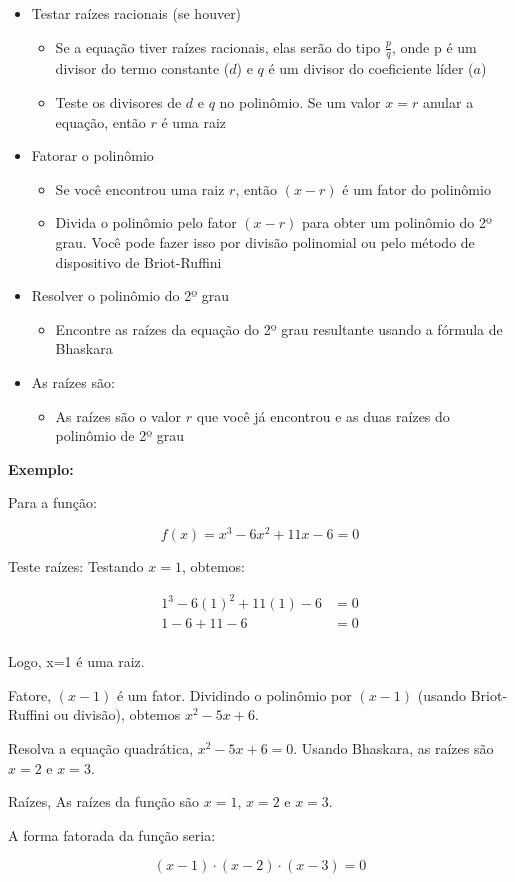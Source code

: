\documentclass[../resumo.tex]{subfiles}
\begin{document}
	\begin{itemize}
		\item Testar raízes racionais (se houver)
		\begin{itemize}
			\item Se a equação tiver raízes racionais, elas serão do tipo $\frac{p}{q}$, onde p é um divisor do
termo constante ($d$) e $q$ é um divisor do coeficiente líder ($a$)
			\item Teste os divisores de $d$ e $q$ no polinômio. Se um valor $x = r$ anular a equação, então $r$ é uma raiz
		\end{itemize}
		\item Fatorar o polinômio
		\begin{itemize}
			\item Se você encontrou uma raiz $r$, então $(x - r)$ é um fator do polinômio
			\item Divida o polinômio pelo fator $(x - r)$ para obter um polinômio do 2º grau. Você pode
fazer isso por divisão polinomial ou pelo método de dispositivo de Briot-Ruffini
		\end{itemize}
		\item Resolver o polinômio do 2º grau
		\begin{itemize}
			\item Encontre as raízes da equação do 2º grau resultante usando a fórmula de Bhaskara
		\end{itemize}
		\item As raízes são:
		\begin{itemize}
			\item As raízes são o valor $r$ que você já encontrou e as duas raízes do polinômio de 2º grau
		\end{itemize}
	\end{itemize}

	\textbf{Exemplo:}

	Para a função:

	\[ f(x) = x^3 - 6x^2 + 11x - 6 = 0 \]

	Teste raízes: Testando $x = 1$, obtemos:

	\begin{align*}
		1^3 - 6(1)^2 + 11(1) - 6 &= 0 \\
		1 - 6 + 11 - 6 &= 0 \\
	\end{align*}

	Logo, x=1 é uma raiz.

	Fatore, $(x - 1)$ é um fator. Dividindo o polinômio por $(x - 1)$ (usando Briot-Ruffini ou divisão), obtemos $x^2 - 5x + 6$.

	Resolva a equação quadrática, $x^2 - 5x + 6 = 0$. Usando Bhaskara, as raízes são $x = 2$ e $x = 3$.

	Raízes, As raízes da função são $x = 1$, $x = 2$ e $x = 3$.

	A forma fatorada da função seria:

	\[ (x - 1)\cdot(x - 2)\cdot(x - 3) = 0 \]
\end{document}
